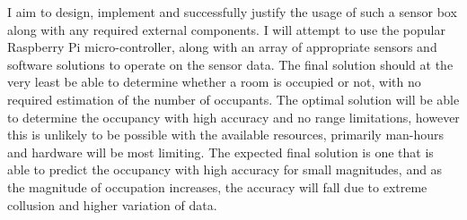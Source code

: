 \documentclass[11pt]{article}
\begin{document}
I aim to design, implement and successfully justify the usage of such a sensor box along with any required external components. I will attempt to use the popular Raspberry Pi micro-controller, along with an array of appropriate sensors and software solutions to operate on the sensor data. The final solution should at the very least be able to determine whether a room is occupied or not, with no required estimation of the number of occupants. The optimal solution will be able to determine the occupancy with high accuracy and no range limitations, however this is unlikely to be possible with the available resources, primarily man-hours and hardware will be most limiting. The expected final solution is one that is able to predict the occupancy with high accuracy for small magnitudes, and as the magnitude of occupation increases, the accuracy will fall due to extreme collusion and higher variation of data.
\end{document}
